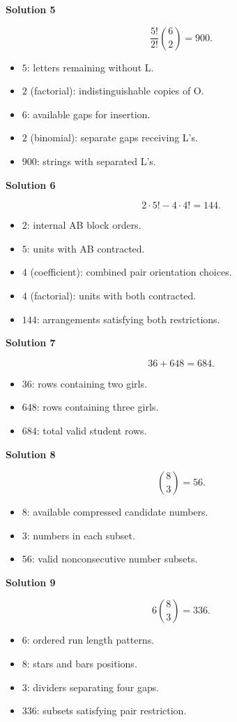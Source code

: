 \documentclass[11pt]{article}
\newcommand{\solution}[1]{%
  \par\Needspace{5\baselineskip}\addvspace{.8\baselineskip}%
  {\large\bfseries Solution #1\par}\nopagebreak[4]}
\begin{document}
\clearpage
\solution{5}
\[
\frac{5!}{2!}\binom62=\boxed{900}.
\]
\begin{itemize}
\item \(5\): letters remaining without L.
\item \(2\) (factorial): indistinguishable copies of O.
\item \(6\): available gaps for insertion.
\item \(2\) (binomial): separate gaps receiving L's.
\item \(900\): strings with separated L's.
\end{itemize}

\solution{6}
\[
2\cdot5!-4\cdot4!=\boxed{144}.
\]
\begin{itemize}
\item \(2\): internal AB block orders.
\item \(5\): units with AB contracted.
\item \(4\) (coefficient): combined pair orientation choices.
\item \(4\) (factorial): units with both contracted.
\item \(144\): arrangements satisfying both restrictions.
\end{itemize}

\solution{7}
\[
36+648=\boxed{684}.
\]
\begin{itemize}
\item \(36\): rows containing two girls.
\item \(648\): rows containing three girls.
\item \(684\): total valid student rows.
\end{itemize}

\clearpage
\solution{8}
\[
\binom83=\boxed{56}.
\]
\begin{itemize}
\item \(8\): available compressed candidate numbers.
\item \(3\): numbers in each subset.
\item \(56\): valid nonconsecutive number subsets.
\end{itemize}

\solution{9}
\[
6\binom83=\boxed{336}.
\]
\begin{itemize}
\item \(6\): ordered run length patterns.
\item \(8\): stars and bars positions.
\item \(3\): dividers separating four gaps.
\item \(336\): subsets satisfying pair restriction.
\end{itemize}
\end{document}
